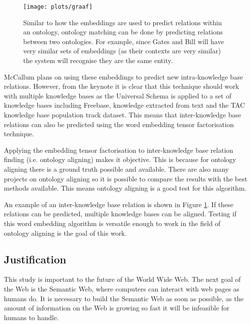 \documentclass{article}
\begin{document}
 \begin{figure}[H]
 \centering
 \texttt{[image: plots/graaf]}
 \caption[Ontology matching graph example]{Similar to how the embeddings are used to predict relations within an ontology, ontology matching can be done by predicting relations between two ontologies. For example, since Gates and Bill will have very similar sets of embeddings (as their contexts are very similar) the system will recognise they are the same entity.}
 \label{merge_graph}
 \end{figure}
 
 McCallum plans on using these embeddings to predict new intra-knowledge base relations. However, from the keynote it is clear that this technique should work with multiple knowledge bases as the Universal Schema is applied to a set of knowledge bases including Freebase, knowledge extracted from text and the TAC knowledge base population track dataset. This means that inter-knowledge base relations can also be predicted using the word embedding tensor factorisation technique.
 
 Applying the embedding tensor factorisation to inter-knowledge base relation finding (i.e. ontology aligning) makes it objective. This is because for ontology aligning there is a ground truth possible and available. There are also many projects on ontology aligning so it is possible to compare the results with the best methods available. This means ontology aligning is a good test for this algorithm.
 
 An example of an inter-knowledge base relation is shown in Figure \ref{merge_graph}. If these relations can be predicted, multiple knowledge bases can be aligned. Testing if this word embedding algorithm is versatile enough to work in the field of ontology aligning is the goal of this work.
 
 \subsection{Justification} 
 This study is important to the future of the World Wide Web. The next goal of the Web is the Semantic Web, where computers can interact with web pages as humans do. It is necessary to build the Semantic Web as soon as possible, as the amount of information on the Web is growing so fast it will be infeasible for humans to handle\cite{overload}.
\end{document}
